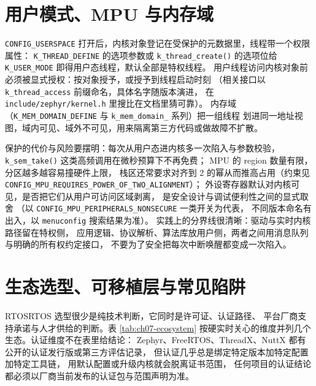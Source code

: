\documentclass[12pt,a4paper,fontset=fandol]{ctexbook}
\newcommand{\Fn}[1]{\texttt{#1()}}
\newcommand{\Tp}[1]{\texttt{#1}}
\newcommand{\Bk}{\discretionary{}{}{}}
\newcommand{\Lang}[1]{\textsf{#1}}
\newcommand{\DomRtos}{\Lang{RTOS}}
\begin{document}
\section{用户模式、MPU 与内存域}
\label{sec:ch07-userspace}

\Tp{CONFIG\_USERSPACE} 打开后，内核对象登记在受保护的元数据里，线程带一个权限属性：
\Tp{K\_THREAD\_DEFINE} 的选项参数或 \Fn{k\_thread\_create} 的选项位给
\Tp{K\_USER\_MODE} 即得用户态线程，默认全部是特权线程。
用户线程访问内核对象前必须被显式授权：按对象授予，或授予到线程启动时刻
（相关接口以 \Tp{k\_thread\_access} 前缀命名，具体名字随版本演进，
在 \Tp{include/zephyr/kernel.h} 里搜比在文档里猜可靠）。
内存域（\Tp{K\_MEM\_DOMAIN\_DEFINE} 与 \Tp{k\_mem\_domain\_} 系列）把一组线程
划进同一地址视图，域内可见、域外不可见，用来隔离第三方代码或做故障不扩散。

保护的代价与风险要摆明：每次从用户态进内核多一次陷入与参数校验，
\Fn{k\_{\Bk}sem\_{\Bk}take} 这类高频调用在微秒预算下不再免费；
MPU 的 region 数量有限，分区越多越容易撞硬件上限，
栈区还常要求对齐到 2 的幂从而推高占用（约束见
\Tp{CONFIG\_{\Bk}MPU\_{\Bk}REQUIRES\_{\Bk}POWER\_{\Bk}OF\_{\Bk}TWO\_{\Bk}ALIGNMENT}）；
外设寄存器默认对内核可见，是否把它们从用户可访问区域剥离，
是安全设计与调试便利性之间的显式取舍
（以 \Tp{CONFIG\_{\Bk}MPU\_{\Bk}PERIPHERALS{\Bk}\_NONSECURE} 一类开关为代表，
不同版本命名有出入，以 \Tp{menuconfig} 搜索结果为准）。
实践上的分界线很清晰：驱动与实时内核路径留在特权侧，
应用逻辑、协议解析、算法库放用户侧，两者之间用消息队列与明确的所有权约定接口，
不要为了安全把每次中断唤醒都变成一次陷入。

\section{生态选型、可移植层与常见陷阱}
\label{sec:ch07-ecosystem}

\DomRtos{}RTOS 选型很少是纯技术判断，它同时是许可证、认证路径、
平台厂商支持承诺与人才供给的判断。表 \ref{tab:ch07-ecosystem}
按硬实时关心的维度并列几个生态。认证维度不在表里给结论：
Zephyr、FreeRTOS、ThreadX、NuttX 都有公开的认证发行版或第三方评估记录，
但认证几乎总是绑定特定版本加特定配置加特定工具链，
用默认配置或升级内核就会脱离证书范围，
任何项目的认证结论都必须以厂商当前发布的认证包与范围声明为准。
\end{document}
